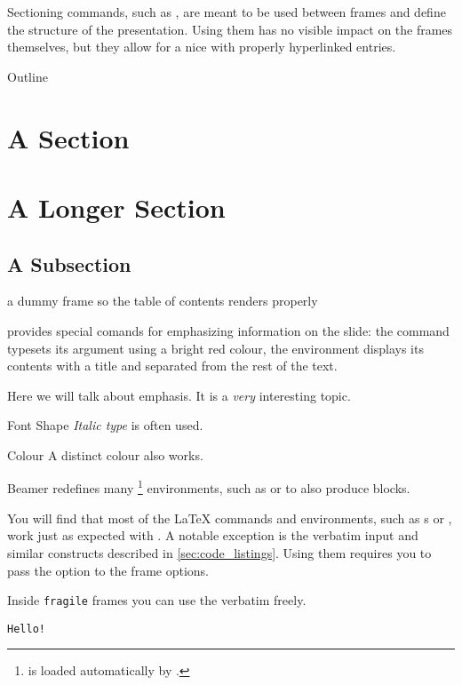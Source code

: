 Sectioning commands, such as , are meant to be used between frames
and define the structure of the presentation. Using them has no visible impact
on the frames themselves, but they allow for a  nice  with
properly hyperlinked entries.
\begin{example}
\begin{frame}{Outline}
  \tableofcontents
\end{frame}

\section{A Section}
\begin{frame}
\end{frame}
\section{A Longer Section}
\subsection{A Subsection}
\begin{frame}
  a dummy frame so the table of contents renders properly
\end{frame}
\end{example}

 provides special comands for emphasizing information on the slide:
the  command typesets its argument using a bright red colour, the
 environment displays its contents with a title and separated from
the rest of the text.
\begin{example}
\begin{frame} %
Here we will talk about
\alert{emphasis}. It is a
\emph{very} interesting topic.
\begin{block}{Font Shape}
  \emph{Italic type} is often
  used.
\end{block}
\begin{block}{Colour}
  A distinct \alert{colour}
  also works.
\end{block}
\end{frame} %
\end{example}
Beamer redefines many \footnote{ is loaded automatically by
  .} environments, such as  or  to also produce blocks.

You will find that most of the \LaTeX{} commands and environments, such as
s or , work just as expected with . A notable
exception is the verbatim input and similar constructs described in
\autoref{sec:code_listings}. Using them requires you to pass the
 option to the frame options.
\begin{example}
\begin{frame}[fragile]
  Inside \verb|fragile| frames
  you can use the verbatim
  freely.
  \begin{verbatim}
Hello!
  \end{verbatim}
\end{frame}
\end{example}

